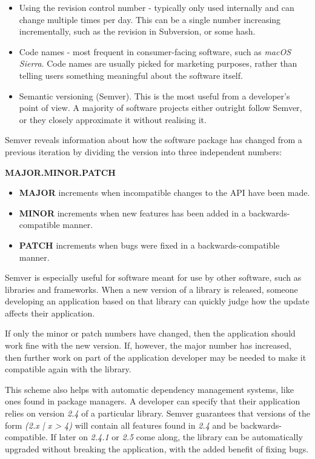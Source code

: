 \documentclass{l4proj}
\begin{document}
\begin{itemize}
\item Using the revision control number - typically only used
internally and can change multiple times per day. This can be a single
number increasing incrementally, such as the revision in Subversion,
or some hash.
\item Code names - most frequent in consumer-facing software, such as
\textit{macOS Sierra}. Code names are usually picked for marketing
purposes, rather than telling users something meaningful about the
software itself.
\item Semantic versioning (Semver)\cite{SemanticVersioning}. This is
the most useful from a developer's point of view. A majority of
software projects either outright follow Semver, or they closely
approximate it without realising it.
\end{itemize}

Semver reveals information about how the software package has changed
from a previous iteration by dividing the version into three
independent numbers:
\begin{center}
\textbf{MAJOR.MINOR.PATCH}
\end{center}

\begin{itemize}
\item \textbf{MAJOR} increments when incompatible changes to the API
have been made.
\item \textbf{MINOR} increments when new features has been added in a
backwards-compatible manner.
\item \textbf{PATCH} increments when bugs were fixed in a
backwards-compatible manner.
\end{itemize}

Semver is especially useful for software meant for use by other
software, such as libraries and frameworks. When a new version of a
library is released, someone developing an application based on that
library can quickly judge how the update affects their application.

If only the minor or patch numbers have changed, then the application
should work fine with the new version. If, however, the major number
has increased, then further work on part of the application developer
may be needed to make it compatible again with the library.

This scheme also helps with automatic dependency management systems,
like ones found in package managers. A developer can specify that
their application relies on version \textit{2.4} of a particular
library. Semver guarantees that versions of the form \textit{(2.x | x
 > 4)} will contain all features found in \textit{2.4} and be backwards-compatible.
If later on \textit{2.4.1} or \textit{2.5} come along, the
library can be automatically upgraded without breaking the
application, with the added benefit of fixing bugs.
\end{document}
